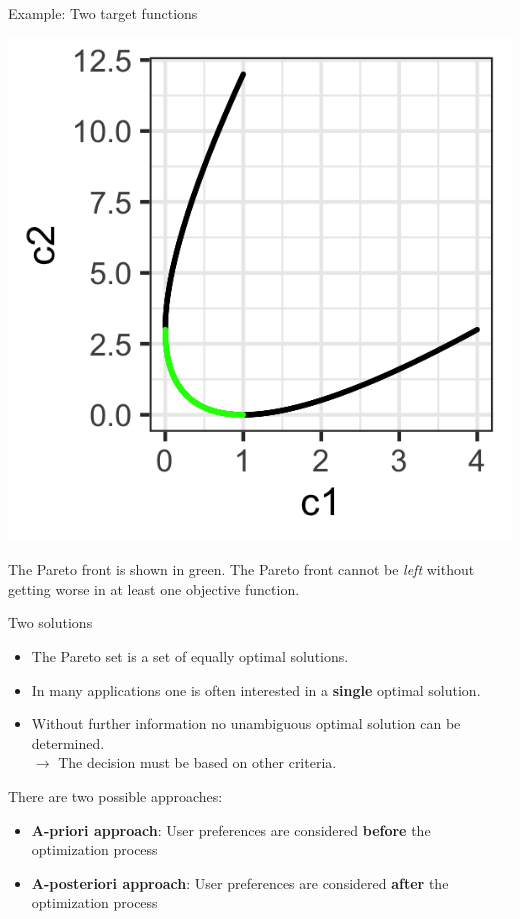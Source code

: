 \begin{frame}[allowframebreaks]{Example: Two target functions}
    \begin{center}
    \includegraphics[scale=0.2]{images/graph3}
    \end{center}
    \vspace*{-0.3cm}

The Pareto front is shown in green.
    The Pareto front cannot be \emph{left} without getting worse in at least one objective function.

\end{frame}


\begin{frame}{Two solutions}

\begin{itemize}
\item The Pareto set is a set of equally optimal solutions.
\item In many applications one is often interested in a \textbf{single} optimal solution.
\item Without further information no unambiguous optimal solution can be determined. \\
$\to$ The decision must be based on other criteria.
\end{itemize}

    \vspace{0.5cm}

There are two possible approaches:
\begin{itemize}
\item \textbf{A-priori approach}: User preferences are considered \textbf{before} the optimization process
\item \textbf{A-posteriori approach}: User preferences are considered \textbf{after} the optimization process
\end{itemize}

\end{frame}

